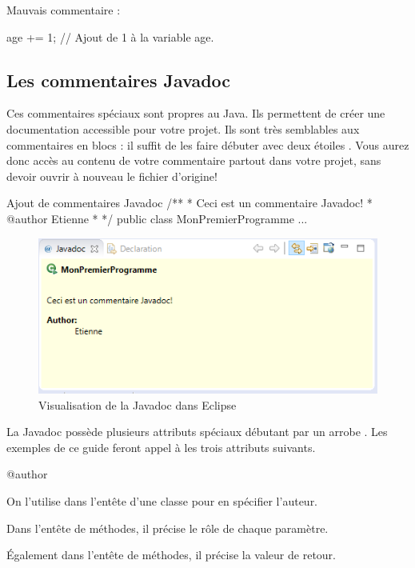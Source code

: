 \documentclass[12pt]{report}
\newcommand{\commande}[1]{%
\tcbox[on line, size=fbox, colframe=black, boxrule=0.75pt, tcbox raise base]{#1} %
}
\begin{document}
Mauvais commentaire :
\begin{code}
age += 1; // Ajout de 1 à la variable age.
\end{code}
%
%
%
%
\subsection{Les commentaires Javadoc}
%
%
Ces commentaires spéciaux sont propres au Java. Ils permettent de créer une documentation accessible pour votre projet. Ils sont très semblables aux commentaires en blocs : il suffit de les faire débuter avec deux étoiles \commande{/**}. Vous aurez donc accès au contenu de votre commentaire partout dans votre projet, sans devoir ouvrir à nouveau le fichier d'origine!
%
%
%
\begin{MyTCB}{Ajout de commentaires Javadoc}
/**
 * Ceci est un commentaire Javadoc!
 * @author Etienne
 *
 */
public class MonPremierProgramme { ... }
\end{MyTCB}
%
%
\begin{figure}[!ht]
	\centering
	\includegraphics[scale=1]{javadoc-eclipse.png}
	\caption{Visualisation de la Javadoc dans Eclipse}
\end{figure}
%
%
La Javadoc possède plusieurs attributs spéciaux débutant par un arrobe \commande{@}. Les exemples de ce guide feront appel à les trois attributs suivants.

\begin{labeling}{@author\ }

\item[\textbf{@author}] On l'utilise dans l'entête d'une classe pour en spécifier l'auteur.
\item[\textbf{@param}] Dans l'entête de méthodes, il précise le rôle de chaque paramètre.
\item[\textbf{@return}] Également dans l'entête de méthodes, il précise la valeur de retour.

\end{labeling}
%
\end{document}
